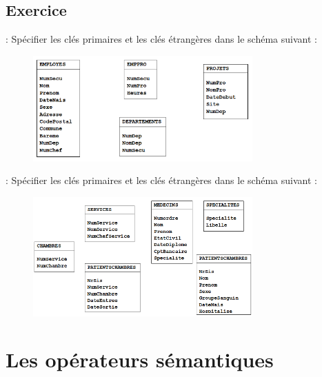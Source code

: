 \documentclass[10pt]{beamer}
\begin{document}
\subsection{Exercice}
\begin{frame}{\secname : \subsecname}
    Spécifier les clés primaires et les clés étrangères dans le schéma suivant :
    \begin{figure}
        \begin{center}
            \includegraphics[width=0.75\textwidth]{../assets/img/bd_employe.png}
            \label{Fig:bd_employe}
        \end{center}
    \end{figure}
\end{frame}

\begin{frame}{\secname : \subsecname}
    Spécifier les clés primaires et les clés étrangères dans le schéma suivant :
    \begin{figure}
        \begin{center}
            \includegraphics[width=0.75\textwidth]{../assets/img/bd_hopital.png}
            \label{Fig:bd_hopital}
        \end{center}
    \end{figure}
\end{frame}

\section{Les opérateurs sémantiques}
\end{document}
